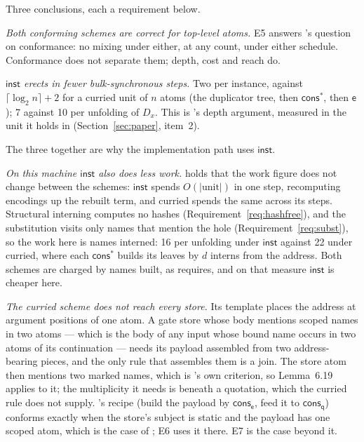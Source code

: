 \documentclass[11pt,a4paper]{article}
\newcommand{\ev}{\mathsf{e}}
\newcommand{\qq}{\mathsf{q}}
\newcommand{\cons}{\mathsf{cons}}
\theoremstyle{definition}
\theoremstyle{plain}
\newcommand{\inst}{\mathsf{inst}}
\newcommand{\cstar}{\mathsf{cons}^{*}}
\begin{document}
Three conclusions, each a requirement below.

\emph{Both conforming schemes are correct for top-level atoms.} E5 answers
\cite[Rem.~5.20]{combspec}'s question on conformance: no mixing under either,
at any count, under either schedule. Conformance does not separate them;
depth, cost and reach do.

\emph{$\inst$ erects in fewer bulk-synchronous steps.} Two per instance,
against $\lceil\log_{2} n\rceil + 2$ for a curried unit of $n$ atoms (the
duplicator tree, then $\cstar$, then $\ev$); 7 against 10 per unfolding of
$D_{x}$. This is \cite[Rem.~5.22]{combspec}'s depth argument, measured in the
unit it holds in (Section~\ref{sec:paper}, item~2).

The three together are why the implementation path uses $\inst$.

\emph{On this machine $\inst$ also does less work.}
\cite[Rem.~5.22]{combspec} holds that the work figure does not change between
the schemes: $\inst$ spends $O(|\mathrm{unit}|)$ in one step, recomputing
encodings up the rebuilt term, and curried spends the same across its steps.
Structural interning computes no hashes (Requirement~\ref{req:hashfree}), and
the substitution visits only names that mention the hole
(Requirement~\ref{req:subst}), so the work here is names interned: 16 per
unfolding under $\inst$ against 22 under curried, where each $\cstar$ builds
its leaves by $d$ interns from the address. Both schemes are charged by names
built, as \cite[Req.~5.25]{combspec} requires, and on that measure $\inst$ is
cheaper here.

\emph{The curried scheme does not reach every store.} Its template places the
address at argument positions of one atom. A gate store whose body mentions
scoped names in two atoms --- which is the body of any input whose bound name
occurs in two atoms of its continuation --- needs its payload assembled from
two address-bearing pieces, and the only rule that assembles them is a join.
The store atom then mentions two marked names, which is
\cite[Rem.~6.20]{draft3}'s own criterion, so Lemma~6.19 applies to it; the
multiplicity it needs is beneath a quotation, which the curried rule does not
supply. \cite[Req.~4.9]{combspec}'s recipe (build the payload by $\cons_{\ev}$,
feed it to $\cons_{\qq}$) conforms exactly when the store's subject is static
and the payload has one scoped atom, which is the case of
\cite[Ex.~6.9]{draft3}; E6 uses it there. E7 is the case beyond it.
\end{document}
